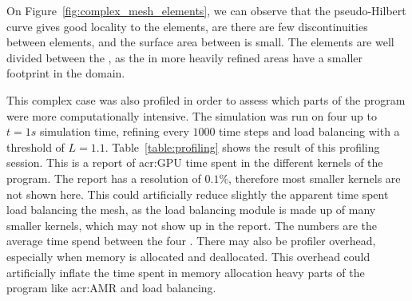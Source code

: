 On Figure~\ref{fig:complex_mesh_elements}, we can observe that the pseudo-Hilbert curve gives good
locality to the elements, are there are few discontinuities between elements, and the surface area
between  is small. The elements are well divided between the
, as the  in more heavily refined areas have a smaller
footprint in the domain.

This complex case was also profiled in order to assess which parts of the program were more
computationally intensive. The simulation was run on four  up to \(t = 1 s\)
simulation time, refining every \(1000\) time steps and load balancing with a threshold of \(L =
1.1\). Table~\ref{table:profiling} shows the result of this profiling session. This is a report of
\acrshort{acr:GPU} time spent in the different kernels of the program. The report has a resolution
of \(0.1 \% \), therefore most smaller kernels are not shown here. This could artificially reduce
slightly the apparent time spent load balancing the mesh, as the load balancing module is made up of
many smaller kernels, which may not show up in the report. The numbers are the average time spend
between the four . There may also be profiler overhead, especially when memory
is allocated and deallocated. This overhead could artificially inflate the time spent in memory
allocation heavy parts of the program like \acrshort{acr:AMR} and load balancing.

